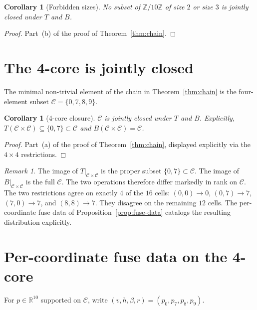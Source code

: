 \documentclass[11pt,reqno]{amsart}
\theoremstyle{plain}
\newtheorem{corollary}[theorem]{Corollary}
\theoremstyle{definition}
\theoremstyle{remark}
\newtheorem*{remark}{Remark}
\newcommand{\Z}{\mathbb{Z}}
\newcommand{\R}{\mathbb{R}}
\newcommand{\Zten}{\Z/10\Z}
\newcommand{\Cfour}{\mathcal{C}}
\begin{document}
\begin{corollary}[Forbidden sizes]\label{cor:forbidden}
No subset of $\Zten$ of size $2$ or size $3$ is jointly closed under
$T$ and $B$.
\end{corollary}

\begin{proof}
Part~(b) of the proof of Theorem~\ref{thm:chain}.
\end{proof}

\section{The 4-core is jointly closed}\label{sec:4core}

The minimal non-trivial element of the chain in
Theorem~\ref{thm:chain} is the four-element subset
$\Cfour=\{0,7,8,9\}$.

\begin{corollary}[4-core closure]\label{cor:4core}
$\Cfour$ is jointly closed under $T$ and $B$. Explicitly,
$T(\Cfour\times\Cfour)\subseteq\{0,7\}\subset\Cfour$ and
$B(\Cfour\times\Cfour)=\Cfour$.
\end{corollary}

\begin{proof}
Part~(a) of the proof of Theorem~\ref{thm:chain}, displayed
explicitly via the $4\times 4$ restrictions.
\end{proof}

\begin{remark}\label{rem:rank-disparity}
The image of $T\big|_{\Cfour\times\Cfour}$ is the proper subset
$\{0,7\}\subset\Cfour$. The image of $B\big|_{\Cfour\times\Cfour}$
is the full $\Cfour$. The two operations therefore differ
markedly in rank on $\Cfour$. The two restrictions agree on
exactly $4$ of the $16$ cells: $(0,0)\to 0$, $(0,7)\to 7$,
$(7,0)\to 7$, and $(8,8)\to 7$. They disagree on the remaining
$12$ cells. The per-coordinate fuse data of
Proposition~\ref{prop:fuse-data} catalogs the resulting
distribution explicitly.
\end{remark}

\section{Per-coordinate fuse data on the 4-core}\label{sec:norm}

For $p\in\R^{10}$ supported on $\Cfour$, write
$(v,h,\beta,r)=(p_{0},p_{7},p_{8},p_{9})$.
\end{document}
